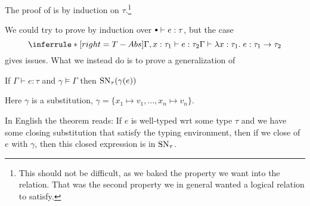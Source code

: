 The proof of  is by induction on $\tau$.\footnote{This should not be difficult, as we baked the property we want into the relation. That was the second property we in general wanted a logical relation to satisfy.}

We could try to prove  by induction over $\mtenv \vdash e : \tau$, but the case
\[
  \TAbs
\]
gives issues. What we instead do is to prove a generalization of 
\begin{astrnorm}
  If $\Gamma \vdash e : \tau$ and $\gamma \models \Gamma$ then $\operatorname{SN}_{\tau}(\gamma(e))$
\end{astrnorm}
Here $\gamma$ is a substitution, $\gamma = \{x_1 \mapsto v_1, \dots , x_n \mapsto v_n\}$.

In English the theorem reads: If $e$ is well-typed wrt some type $\tau$ and we have some closing substitution that satisfy the typing environment, then if we close of $e$ with $\gamma$, then this closed expression is in $\operatorname{SN}_\tau$.

